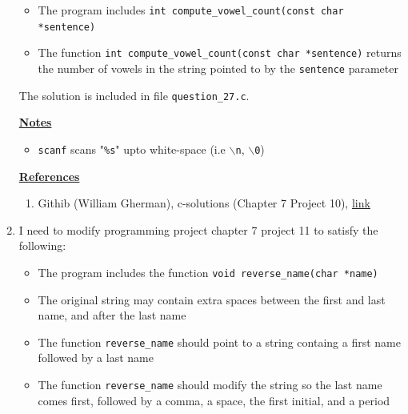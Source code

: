 \documentclass[12pt]{article}
\begin{document}
\begin{enumerate}[1.]
    \begin{itemize}
        \item The program includes \texttt{int compute\_vowel\_count(const char *sentence)}
        \item The function \texttt{int compute\_vowel\_count(const char *sentence)} returns the number of
        vowels in the string pointed to by the \texttt{sentence} parameter
    \end{itemize}

    \bigskip

    The solution is included in file \texttt{question\_27.c}.

    \bigskip

    \underline{\textbf{Notes}}

    \bigskip

    \begin{itemize}
        \item \texttt{scanf} scans "\texttt{\%s}" upto white-space (i.e \texttt{$\backslash$n}, \texttt{$\backslash$0})
    \end{itemize}

    \bigskip

    \underline{\textbf{References}}

    \begin{enumerate}[1)]
        \item Githib (William Gherman), c-solutions (Chapter 7 Project 10), \href{https://github.com/williamgherman/c-solutions/blob/master/07/projects/10/10.c}{link}
    \end{enumerate}

    \item

    I need to modify programming project chapter 7 project 11 to satisfy the following:

    \begin{itemize}
        \item The program includes the function \texttt{void reverse\_name(char *name)}
        \item The original string may contain extra spaces between the first and last name, and after the last name
        \item The function \texttt{reverse\_name} should point to a string containg a first name followed
        by a last name
        \item The function \texttt{reverse\_name} should modify the string so the
        last name comes first, followed by a comma, a space, the first initial, and a period
    \end{itemize}


\end{enumerate}
\end{document}
